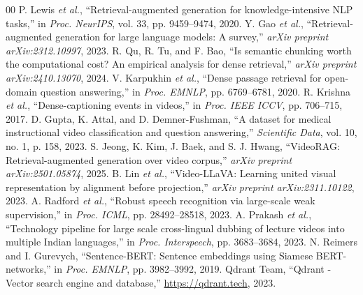 \documentclass[conference]{IEEEtran}
\begin{document}

\begin{thebibliography}{00}
\scriptsize
\setlength{\itemsep}{0pt}
\setlength{\parskip}{0pt}
 P. Lewis \textit{et al.}, ``Retrieval-augmented generation for knowledge-intensive NLP tasks,'' in \textit{Proc. NeurIPS}, vol. 33, pp. 9459--9474, 2020.
 Y. Gao \textit{et al.}, ``Retrieval-augmented generation for large language models: A survey,'' \textit{arXiv preprint arXiv:2312.10997}, 2023.
 R. Qu, R. Tu, and F. Bao, ``Is semantic chunking worth the computational cost? An empirical analysis for dense retrieval,'' \textit{arXiv preprint arXiv:2410.13070}, 2024.
 V. Karpukhin \textit{et al.}, ``Dense passage retrieval for open-domain question answering,'' in \textit{Proc. EMNLP}, pp. 6769--6781, 2020.
 R. Krishna \textit{et al.}, ``Dense-captioning events in videos,'' in \textit{Proc. IEEE ICCV}, pp. 706--715, 2017.
 D. Gupta, K. Attal, and D. Demner-Fushman, ``A dataset for medical instructional video classification and question answering,'' \textit{Scientific Data}, vol. 10, no. 1, p. 158, 2023.
 S. Jeong, K. Kim, J. Baek, and S. J. Hwang, ``VideoRAG: Retrieval-augmented generation over video corpus,'' \textit{arXiv preprint arXiv:2501.05874}, 2025.
 B. Lin \textit{et al.}, ``Video-LLaVA: Learning united visual representation by alignment before projection,'' \textit{arXiv preprint arXiv:2311.10122}, 2023.
 A. Radford \textit{et al.}, ``Robust speech recognition via large-scale weak supervision,'' in \textit{Proc. ICML}, pp. 28492--28518, 2023.
 A. Prakash \textit{et al.}, ``Technology pipeline for large scale cross-lingual dubbing of lecture videos into multiple Indian languages,'' in \textit{Proc. Interspeech}, pp. 3683--3684, 2023.
 N. Reimers and I. Gurevych, ``Sentence-BERT: Sentence embeddings using Siamese BERT-networks,'' in \textit{Proc. EMNLP}, pp. 3982--3992, 2019.
 Qdrant Team, ``Qdrant - Vector search engine and database,'' \url{https://qdrant.tech}, 2023.
\end{thebibliography}
\end{document}
